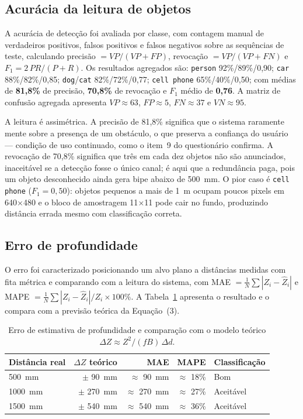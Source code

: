 \documentclass[12pt]{article}
\begin{document}
\subsection{Acurácia da leitura de objetos}

A acurácia de detecção foi avaliada por classe, com contagem manual de
verdadeiros positivos, falsos positivos e falsos negativos sobre as sequências
de teste, calculando precisão $= VP/(VP+FP)$, revocação $= VP/(VP+FN)$ e
$F_1 = 2\,PR/(P+R)$. Os resultados agregados são: \texttt{person}
92\%/89\%/0,90; \texttt{car} 88\%/82\%/0,85; \texttt{dog}/\texttt{cat}
82\%/72\%/0,77; \texttt{cell phone} 65\%/40\%/0,50; com médias de
\textbf{81,8\%} de precisão, \textbf{70,8\%} de revocação e $F_1$ médio de
\textbf{0,76}. A matriz de confusão agregada apresenta $VP \approx 63$,
$FP \approx 5$, $FN \approx 37$ e $VN \approx 95$.

A leitura é assimétrica. A precisão de 81,8\% significa que o sistema
raramente mente sobre a presença de um obstáculo, o que preserva a confiança
do usuário --- condição de uso continuado, como o item~9 do questionário
confirma. A revocação de 70,8\% significa que três em cada dez objetos não são
anunciados, inaceitável se a detecção fosse o único canal; é aqui que a
redundância paga, pois um objeto desconhecido ainda gera bipe abaixo de
500~mm. O pior caso é \texttt{cell phone} ($F_1 = 0{,}50$): objetos pequenos a
mais de 1~m ocupam poucos pixels em 640$\times$480 e o bloco de amostragem
11$\times$11 pode cair no fundo, produzindo distância errada mesmo com
classificação correta.

\subsection{Erro de profundidade}

O erro foi caracterizado posicionando um alvo plano a distâncias medidas com
fita métrica e comparando com a leitura do sistema, com
MAE $= \frac{1}{N}\sum |Z_i - \hat{Z}_i|$ e
MAPE $= \frac{1}{N}\sum |Z_i - \hat{Z}_i| / Z_i \times 100\%$. A Tabela~\ref{tab2}
apresenta o resultado e o compara com a previsão teórica da Equação~(3).

\begin{table}[ht]
\centering
\caption{Erro de estimativa de profundidade e comparação com o modelo teórico $\Delta Z \approx Z^2/(f B)\,\Delta d$.}
\label{tab2}
\footnotesize
\begin{tabular}{lrrrl}
\toprule
\textbf{Distância real} & \textbf{$\Delta Z$ teórico} & \textbf{MAE} & \textbf{MAPE} & \textbf{Classificação} \\
\midrule
500~mm  & $\pm$ 90~mm  & $\approx$ 90~mm  & $\approx$ 18\% & Bom \\
1000~mm & $\pm$ 270~mm & $\approx$ 270~mm & $\approx$ 27\% & Aceitável \\
1500~mm & $\pm$ 540~mm & $\approx$ 540~mm & $\approx$ 36\% & Aceitável \\
\bottomrule
\end{tabular}
\end{table}
\end{document}
